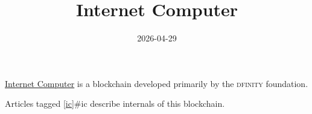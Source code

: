 \documentclass{note}
\title{Internet Computer}
\date{2026-04-29}
\begin{document}
\href{https://internetcomputer.org/}{Internet Computer} is a blockchain developed primarily by the \textsc{dfinity} foundation.

Articles tagged \ref{ic}{#ic} describe internals of this blockchain.
\end{document}
